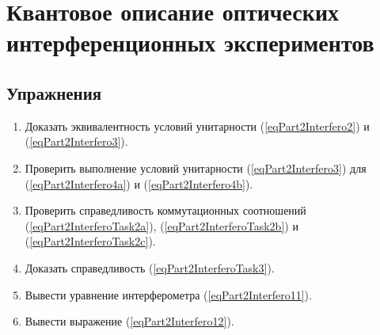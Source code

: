 \chapter{Квантовое описание оптических интерференционных экспериментов}





\section{Упражнения}
\begin{enumerate}
\item Доказать эквивалентность условий унитарности
  (\ref{eqPart2Interfero2}) и  (\ref{eqPart2Interfero3}).
\item Проверить выполнение условий унитарности (\ref{eqPart2Interfero3}) для
  (\ref{eqPart2Interfero4a}) и  (\ref{eqPart2Interfero4b}).
\item Проверить справедливость коммутационных соотношений
  (\ref{eqPart2InterferoTask2a}), (\ref{eqPart2InterferoTask2b}) и
  (\ref{eqPart2InterferoTask2c}). 
\item Доказать справедливость (\ref{eqPart2InterferoTask3}).
\item Вывести уравнение интерферометра (\ref{eqPart2Interfero11}).
\item Вывести выражение (\ref{eqPart2Interfero12}).
\end{enumerate}

